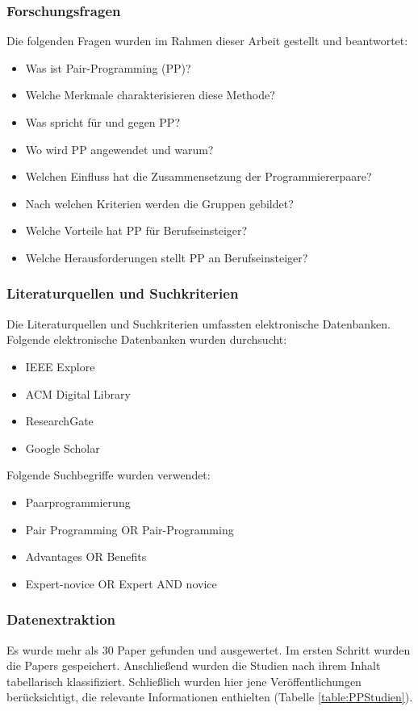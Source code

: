 \subsubsection{Forschungsfragen} Die folgenden Fragen wurden im Rahmen dieser Arbeit gestellt und beantwortet:

\begin{itemize}
\item Was ist Pair-Programming (PP)?
\item Welche Merkmale charakterisieren diese Methode?
\item Was spricht für und gegen PP?
\item Wo wird PP angewendet und warum?
\item Welchen Einfluss hat die Zusammensetzung der Programmiererpaare?
\item Nach welchen Kriterien werden die Gruppen gebildet?
\item  Welche Vorteile hat PP für Berufseinsteiger?
\item Welche Herausforderungen stellt PP an Berufseinsteiger?
\end{itemize}

\subsubsection{Literaturquellen und Suchkriterien} Die Literaturquellen und Suchkriterien umfassten elektronische Datenbanken. Folgende elektronische Datenbanken wurden durchsucht:

\begin{itemize}
\item  IEEE Explore
\item ACM Digital Library
\item ResearchGate
\item Google Scholar
\end{itemize}

Folgende Suchbegriffe wurden verwendet:
\begin{itemize}
\item Paarprogrammierung
\item Pair Programming OR Pair-Programming
\item Advantages OR Benefits
\item Expert-novice OR Expert AND novice
\end{itemize}

\subsubsection{Datenextraktion} Es wurde mehr als 30 Paper gefunden und ausgewertet. Im ersten Schritt wurden die Papers gespeichert. Anschließend wurden die Studien nach ihrem Inhalt tabellarisch klassifiziert. Schließlich wurden hier jene Veröffentlichungen berücksichtigt, die relevante Informationen enthielten (Tabelle \ref{table:PPStudien}).

